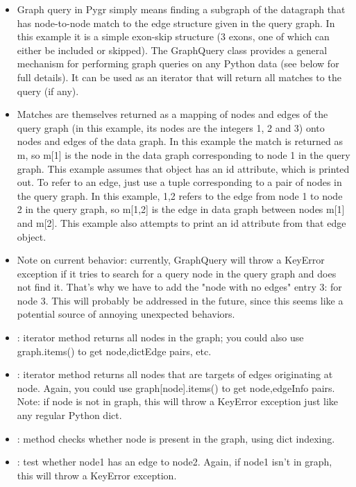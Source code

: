 \documentclass{howto}
\begin{document}
\begin{itemize}
\item         
Graph query in Pygr simply means finding a subgraph of the datagraph that has node-to-node match to the edge structure given in the query graph.  In this example it is a simple exon-skip structure (3 exons, one of which can either be included or skipped).  The GraphQuery class provides a general mechanism for performing graph queries on any Python data (see below for full details).  It can be used as an iterator that will return all matches to the query (if any). 

\item          
Matches are themselves returned as a mapping of nodes and edges of the query graph (in this example, its nodes are the integers 1, 2 and 3) onto nodes and edges of the data graph.  In this example the match is returned as m, so m[1] is the node in the data graph corresponding to node 1 in the query graph.  This example assumes that object has an id attribute, which is printed out.  To refer to an edge, just use a tuple corresponding to a pair of nodes in the query graph.  In this example, 1,2 refers to the edge from node 1 to node 2 in the query graph, so m[1,2] is the edge in data graph between nodes m[1] and m[2].  This example also attempts to print an id attribute from that edge object.

\item         
Note on current behavior: currently, GraphQuery will throw a KeyError exception if it tries to search for a query node in the query graph and does not find it.  That's why we have to add the "node with no edges" entry 3:{} for node 3.  This will probably be addressed in the future, since this seems like a potential source of annoying unexpected behaviors.

\item
{}: iterator method returns all nodes in the graph; you could also use graph.items() to get node,dictEdge pairs, etc.

\item
{}:  iterator method returns all nodes that are targets of edges originating at node.  Again, you could use graph[node].items() to get node,edgeInfo pairs.  Note: if node is not in graph, this will throw a KeyError exception just like any regular Python dict.

\item
{}:   method checks whether node is present in the graph, using dict indexing.

\item
{}:  test whether node1 has an edge to node2.  Again, if node1 isn't in graph, this will throw a KeyError exception.

\end{itemize}
\end{document}
